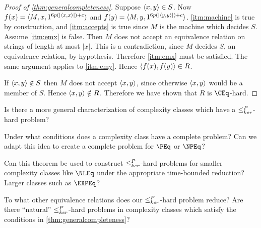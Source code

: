 \begin{proof}[Proof of \autoref{thm:generalcompleteness}]
  Suppose $\langle x,y\rangle\in S$.
  Now $f(x)=\langle M,x,1^{6p(|\langle x,x\rangle|)+c}\rangle$ and $f(y)=\langle M,y,1^{6p(|\langle y,y\rangle|)+c}\rangle$.
  \autoref{itm:machine} is true by construction, and \autoref{itm:accepts} is true since $M$ is the machine which decides $S$.
  Assume \autoref{itm:emx} is false.
  Then $M$ does not accept an equivalence relation on strings of length at most $|x|$.
  This is a contradiction, since $M$ decides $S$, an equivalence relation, by hypothesis.
  Therefore \autoref{itm:emx} must be satisfied.
  The same argument applies to \autoref{itm:emy}.
  Hence $\langle f(x),f(y)\rangle\in R$.

  If $\langle x,y\rangle\notin S$ then $M$ does not accept $\langle x,y\rangle$, since otherwise $\langle x,y\rangle$ would be a member of $S$.
  Hence $\langle x,y\rangle\notin R$.  
  Therefore we have shown that $R$ is $\CEq$-hard.
\end{proof}

\begin{openproblem}
  Is there a more general characterization of complexity classes which have a $\leq^{P}_{ker}$-hard problem?
\end{openproblem}

\begin{openproblem}
  Under what conditions does a complexity class have a complete problem?
  Can we adapt this idea to create a complete problem for $\PEq$ or $\NPEq$?
\end{openproblem}

\begin{openproblem}
  Can this theorem be used to construct $\leq^{P}_{ker}$-hard problems for smaller complexity classes like $\NLEq$ under the appropriate time-bounded reduction?
  Larger classes such as $\EXPEq$?
\end{openproblem}

\begin{openproblem}
  To what other equivalence relations does our $\leq^{P}_{ker}$-hard problem reduce?
  Are there ``natural'' $\leq^{P}_{ker}$-hard problems in complexity classes which satisfy the conditions in \autoref{thm:generalcompleteness}?
\end{openproblem}
